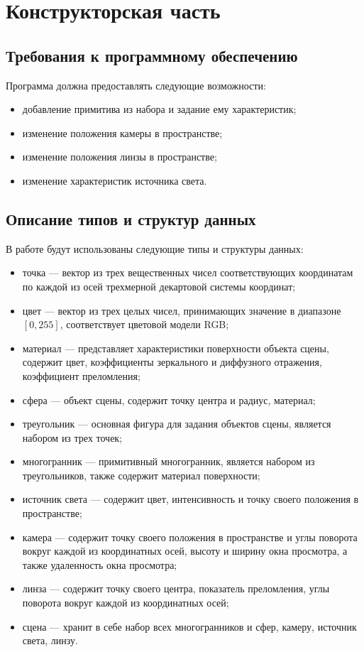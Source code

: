 \section{Конструкторская часть}

\subsection{Требования к программному обеспечению}

Программа должна предоставлять следующие возможности:

\begin{itemize}
	\item добавление примитива из набора и задание ему характеристик;
	\item изменение положения камеры в пространстве;
	\item изменение положения линзы в пространстве;
	\item изменение характеристик источника света.
\end{itemize}


\subsection{Описание типов и структур данных}

В работе будут использованы следующие типы и структуры данных:

\begin{itemize}
	\item точка --- вектор из трех вещественных чисел соответствующих координатам по каждой из осей трехмерной декартовой системы координат;
	\item цвет --- вектор из трех целых чисел, принимающих значение в диапазоне $[0,255]$, соответствует цветовой модели RGB;
	\item материал --- представляет характеристики поверхности объекта сцены, содержит цвет, коэффициенты зеркального и диффузного отражения, коэффициент преломления;
	\item сфера --- объект сцены, содержит точку центра и радиус, материал;
	\item треугольник --- основная фигура для задания объектов сцены, является набором из трех точек;
	\item многогранник --- примитивный многогранник, является набором из треугольников, также содержит материал поверхности;
	\item источник света --- содержит цвет, интенсивность и точку своего положения в пространстве;
	\item камера --- содержит точку своего положения в пространстве и углы поворота вокруг каждой из координатных осей, высоту и ширину окна просмотра, а также удаленность окна просмотра;
	\item линза --- содержит точку своего центра, показатель преломления, углы поворота вокруг каждой из координатных осей;
	\item сцена --- хранит в себе набор всех многогранников и сфер, камеру, источник света, линзу.
\end{itemize}


